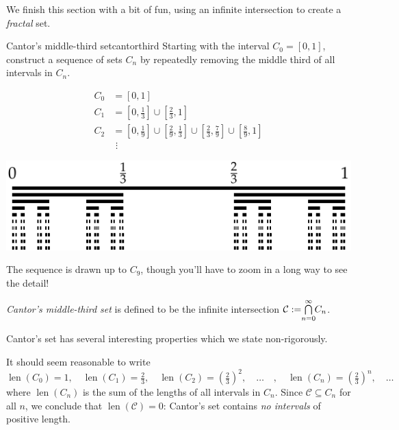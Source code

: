 
\goodbreak



 We finish this section with a bit of fun, using an infinite intersection to create a \emph{fractal} set.

\begin{example}{Cantor's middle-third set}{cantorthird}
	Starting with the interval $C_0=[0,1]$, construct a sequence of sets $C_n$ by repeatedly removing the middle third of all intervals in $C_n$.\par
	
	\begin{minipage}[t]{0.45\linewidth}\vspace{-15pt}
		\begin{align*}
			C_0&=[0,1]\\
			C_1&=[0,\tfrac 13]\cup [\tfrac 23,1]\\
			C_2&=[0,\tfrac 19]\cup [\tfrac 29,\tfrac 13]\cup [\tfrac 23,\tfrac 79]\cup [\tfrac 89,1]\\
			&\mathrel{\,\,\vdots}
		\end{align*}
	\end{minipage}
	\hfill
	\begin{minipage}[t]{0.54\linewidth}\vspace{-10pt}
		\hfill \href{http://www.math.uci.edu/~ndonalds/math13/cantoranim.html}{\includegraphics{setsii-02-cantor}}
	\end{minipage}
	\par

	The sequence is drawn up to $C_9$, though you'll have to zoom in a long way to see the detail!\par

	\emph{Cantor's middle-third set} is defined to be the infinite intersection $\mathcal C:=\negthickspace\bigcap\limits_{n=0}^\infty\negthickspace C_n$.\par

	Cantor's set has several interesting properties which we state non-rigorously.
	\begin{description}\itemsep2pt
		\item[Zero Measure (length)] It should seem reasonable to write
		\[
			\operatorname{len}(C_0)=1,\quad \operatorname{len}(C_1)=\tfrac 23,\quad\operatorname{len}(C_2)=\left(\tfrac 23\right)^2,\quad \ldots\quad ,\quad \operatorname{len}(C_n)=\left(\tfrac 23\right)^n,\quad\ldots
		\]
		where $\operatorname{len}(C_n)$ is the sum of the lengths of all intervals in $C_n$. Since $\mathcal C\subseteq C_n$ for all $n$, we conclude that $\operatorname{len}(\mathcal C)=0$: Cantor's set contains \emph{no intervals} of positive length.
	

\end{description}
\end{example}
